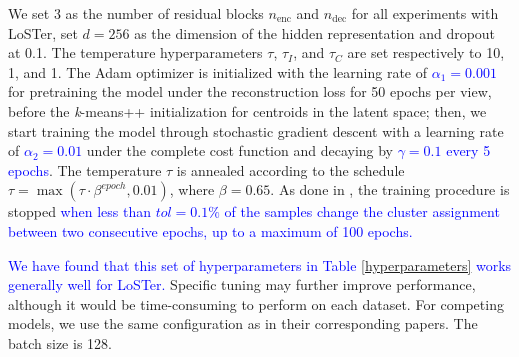 \documentclass[times, review, 10pt]{elsarticle}
\begin{document}
We set 3 as the number of residual blocks $n_{\text{enc}}$ and $n_{\text{dec}}$ for all experiments with LoSTer, set $d=256$ as the dimension of the hidden representation and dropout at 0.1. The temperature hyperparameters $\tau$, $\tau_I$, and $\tau_C$ are set respectively to 10, 1, and 1. The Adam optimizer is initialized with the learning rate of \textcolor{blue}{$\alpha_1 = 0.001$} for pretraining the model under the reconstruction loss for 50 epochs per view, before the \textit{k}-means++ initialization for centroids in the latent space; then, we start training the model through stochastic gradient descent with a learning rate of \textcolor{blue}{$\alpha_2 = 0.01$} under the complete cost function and decaying by \textcolor{blue}{$\gamma = 0.1$ every 5 epochs}. The temperature $\tau$ is annealed according to the schedule $\tau = \max(\tau \cdot \beta^{epoch}, 0.01)$, where $\beta = 0.65$. As done in \cite{xie2016unsupervised,guo2017improved}, the training procedure is stopped \textcolor{blue}{when less than $tol = 0.1\%$ of the samples change the cluster assignment between two consecutive epochs, up to a maximum of 100 epochs.}

\textcolor{blue}{We have found that this set of hyperparameters in Table \ref{hyperparameters} works generally well for LoSTer.} Specific tuning may further improve performance, although it would be time-consuming to perform on each dataset. For competing models, we use the same configuration as in their corresponding papers. The batch size is 128.
\end{document}
